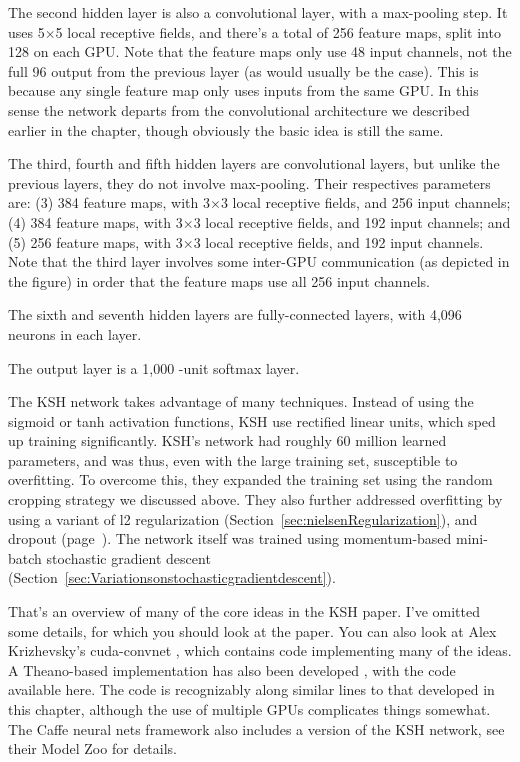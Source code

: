 The second hidden layer is also a convolutional layer, with a max-pooling step. It uses 5$\times$5 local receptive fields, and there's a total of 256 feature maps, split into 128 on each GPU. Note that the feature maps only use 48 input channels, not the full 96 output from the previous layer (as would usually be the case). This is because any single feature map only uses inputs from the same GPU. In this sense the network departs from the convolutional architecture we described earlier in the chapter, though obviously the basic idea is still the same.

The third, fourth and fifth hidden layers are convolutional layers, but unlike the previous layers, they do not involve max-pooling. Their respectives parameters are: (3) 384 feature maps, with 3$\times$3 local receptive fields, and 256 input channels; (4) 384 feature maps, with 3$\times$3 local receptive fields, and 192 input channels; and (5) 256 feature maps, with 3$\times$3 local receptive fields, and 192 input channels. Note that the third layer involves some inter-GPU communication (as depicted in the figure) in order that the feature maps use all 256 input channels.

The sixth and seventh hidden layers are fully-connected layers, with 4,096 neurons in each layer.

The output layer is a 1,000 -unit softmax layer.

The KSH network takes advantage of many techniques. Instead of using the sigmoid or tanh activation functions, KSH use rectified linear units, which sped up training significantly. KSH's network had roughly 60 million learned parameters, and was thus, even with the large training set, susceptible to overfitting. To overcome this, they expanded the training set using the random cropping strategy we discussed above. They also further addressed overfitting by using a variant of l2 regularization (Section~\ref{sec:nielsenRegularization}), and dropout (page~\pageref{page:dropout}). The network itself was trained using momentum-based mini-batch stochastic gradient descent (Section~\ref{sec:Variationsonstochasticgradientdescent}).

That's an overview of many of the core ideas in the KSH paper. I've omitted some details, for which you should look at the paper. You can also look at Alex Krizhevsky's cuda-convnet \cite{Krizhevskycudaconvnet22019}, which contains code implementing many of the ideas. A Theano-based implementation has also been developed \cite{Ding2014TheanobasedLV}, with the code available here. The code is recognizably along similar lines to that developed in this chapter, although the use of multiple GPUs complicates things somewhat. The Caffe neural nets framework also includes a version of the KSH network, see their Model Zoo for details.

